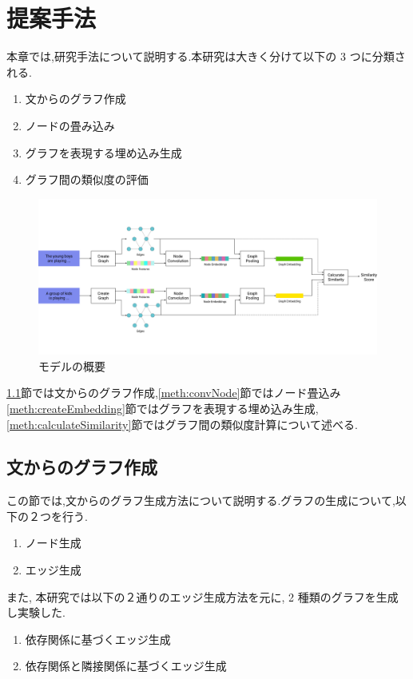 \documentclass[a4j,twoside,12pt, dvipdfmx]{thesis} %
\begin{document}
\addtocounter{chapter}{+2}

\setlength{\baselineskip}{1.95zw}
\setlength{\textheight}{30\baselineskip}
\mainmatter

\fi
%
\renewcommand\thefootnote{\arabic{footnote})}
\def\vector#1{\mbox{\boldmath $#1$}}

\chapter{提案手法}\label{meth}
本章では,研究手法について説明する.本研究は大きく分けて以下の 3 つに分類される.
\begin{enumerate}
  \item 文からのグラフ作成
  \item ノードの畳み込み
  \item グラフを表現する埋め込み生成
  \item グラフ間の類似度の評価
\end{enumerate}
\begin{figure}
  \centering
  \includegraphics[width=\linewidth]
  {img/ModelFlow.jpg}
  \caption{モデルの概要}
  \label{ラベル名}
\end{figure}
\ref{meth:createGraph}節では文からのグラフ作成,\ref{meth:convNode}節ではノード畳込み \ref{meth:createEmbedding}節ではグラフを表現する埋め込み生成, \ref{meth:calculateSimilarity}節ではグラフ間の類似度計算について述べる.

\section{文からのグラフ作成}\label{meth:createGraph}
この節では,文からのグラフ生成方法について説明する.グラフの生成について,以下の２つを行う.
\begin{enumerate}
  \item ノード生成
  \item エッジ生成
\end{enumerate}
また, 本研究では以下の２通りのエッジ生成方法を元に, 2 種類のグラフを生成し実験した.
\begin{enumerate}
  \item 依存関係に基づくエッジ生成
  \item 依存関係と隣接関係に基づくエッジ生成
\end{enumerate}
\end{document}
